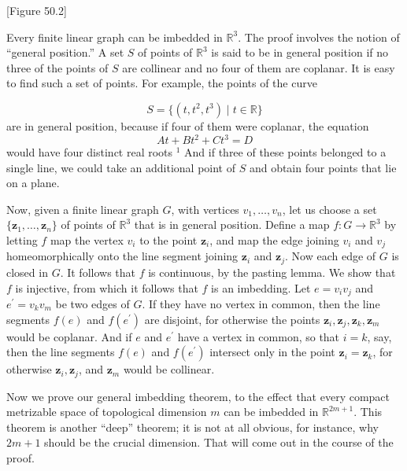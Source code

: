 [Figure 50.2]
\begin{centeredblock}
\begin{example}
\label{ex:\thesection.\theexample}
Every finite linear graph can be imbedded in \(\mathbb{R}^{3}\). The proof involves the notion of ``general position.'' A set \(S\) of points of \(\mathbb{R}^{3}\) is said to be in general position if no three of the points of \(S\) are collinear and no four of them are coplanar. It is easy to find such a set of points. For example, the points of the curve

\[
S = \{ {({t,t^{2},t^{3}}) \mid t \in \mathbb{R}}\}
\]
are in general position, because if four of them were coplanar, the equation
\[
{At} + Bt^{2} + Ct^{3} = D
\]
would have four distinct real roots \({}^{1}\) And if three of these points belonged to a single line, we could take an additional point of \(S\) and obtain four points that lie on a plane.

Now, given a finite linear graph \(G\), with vertices \(v_{1},\ldots ,v_{n}\), let us choose a set \(\{ {\mathbf{z}_{1},\ldots ,\mathbf{z}_{n}}\}\) of points of \(\mathbb{R}^{3}\) that is in general position. Define a map \(f : G \rightarrow {\mathbb{R}}^{3}\) by letting \(f\) map the vertex \(v_{i}\) to the point \(\mathbf{z}_{i}\), and map the edge joining \(v_{i}\) and \(v_{j}\) homeomorphically onto the line segment joining \(\mathbf{z}_{i}\) and \(\mathbf{z}_{j}\). Now each edge of \(G\) is closed in \(G\). It follows that \(f\) is continuous, by the pasting lemma. We show that \(f\) is injective, from which it follows that \(f\) is an imbedding. Let \(e = v_{i}v_{j}\) and \(e^{\prime } = v_{k}v_{m}\) be two edges of \(G\). If they have no vertex in common, then the line segments \(f( e)\) and \(f(e^{\prime })\) are disjoint, for otherwise the points \(\mathbf{z}_{i},\mathbf{z}_{j},\mathbf{z}_{k},\mathbf{z}_{m}\) would be coplanar. And if \(e\) and \(e^{\prime }\) have a vertex in common, so that \(i = k\), say, then the line segments \(f( e)\) and \(f(e^{\prime })\) intersect only in the point \(\mathbf{z}_{i} = \mathbf{z}_{k}\), for otherwise \(\mathbf{z}_{i},\mathbf{z}_{j}\), and \(\mathbf{z}_{m}\) would be collinear.
\end{example}
\end{centeredblock}

Now we prove our general imbedding theorem, to the effect that every compact metrizable space of topological dimension \(m\) can be imbedded in \(\mathbb{R}^{{2m} + 1}\). This theorem is another ``deep'' theorem; it is not at all obvious, for instance, why \({2m} + 1\) should be the crucial dimension. That will come out in the course of the proof.


